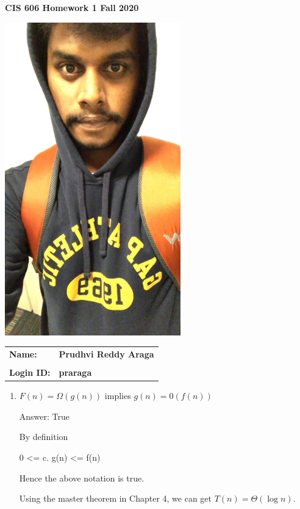 \documentclass[11pt]{article}
\begin{document}
\thispagestyle{plain}

\begin{center}
{\Large \bf CIS 606 \hfil Homework 1 \hfil Fall 2020} \\
\end{center}

\vskip 1in 

\centerline{\includegraphics[width=3in]{Photo.jpg}}

\vskip 0.5in 

\begin{center}
\begin{tabular}{ll}
{\bf Name:}     & {\bf Prudhvi Reddy Araga } \\ \\
{\bf Login ID:} & {\bf praraga }   
\end{tabular}
\end{center}

\newpage

\begin{enumerate}

\itemsep 0.35in
 
\item

$F(n) = \Omega (g(n))$ implies $g(n) = $0$ (f(n))$

Answer: True

By definition

0 \textless{}= c. g(n) \textless{}= f(n)


Hence the above notation is true.

      Using the master theorem in Chapter 4, we can 
      get $T(n) = \Theta (\log{} n)$.

   
\end{enumerate}
\end{document}
